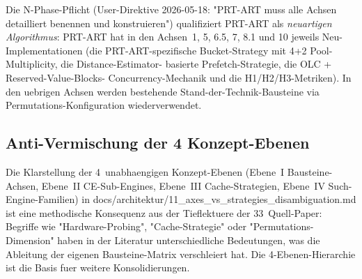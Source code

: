 Die N-Phase-Pflicht (User-Direktive 2026-05-18: "PRT-ART muss alle
Achsen detailliert benennen und konstruieren") qualifiziert PRT-ART
als \emph{neuartigen Algorithmus}: PRT-ART hat in den Achsen~1, 5,
6.5, 7, 8.1 und 10 jeweils Neu-Implementationen (die PRT-ART-spezifische
Bucket-Strategy mit 4+2 Pool-Multiplicity, die Distance-Estimator-
basierte Prefetch-Strategie, die OLC + Reserved-Value-Blocks-
Concurrency-Mechanik und die H1/H2/H3-Metriken). In den uebrigen
Achsen werden bestehende Stand-der-Technik-Bausteine via
Permutations-Konfiguration wiederverwendet.

\subsection{Anti-Vermischung der 4 Konzept-Ebenen}

Die Klarstellung der 4~unabhaengigen Konzept-Ebenen
(Ebene~I Bausteine-Achsen, Ebene~II CE-Sub-Engines, Ebene~III
Cache-Strategien, Ebene~IV Such-Engine-Familien) in
docs/architektur/11\_axes\_vs\_strategies\_disambiguation.md ist eine
methodische Konsequenz aus der Tieflektuere der 33~Quell-Paper:
Begriffe wie "Hardware-Probing", "Cache-Strategie" oder "Permutations-
Dimension" haben in der Literatur unterschiedliche Bedeutungen, was
die Ableitung der eigenen Bausteine-Matrix verschleiert hat. Die
4-Ebenen-Hierarchie ist die Basis fuer weitere Konsolidierungen.
